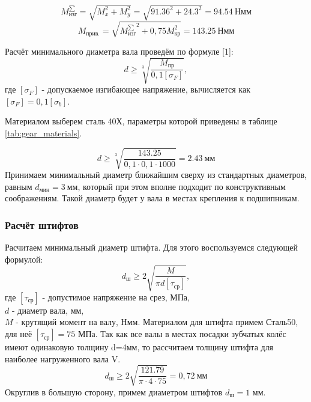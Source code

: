 \documentclass[14pt,a4paper,russian]{scrartcl}
\begin{document}
        \[ M^{\sum}_\text{изг} = \sqrt{M_x^2 + M_y^2} = \sqrt{91.36^2 + 24.3^2} = 94.54\ \text{Нмм}\]
        \[ M_\text{прив.} = \sqrt{{M^{\sum}_\text{изг}}^2 + 0,75M_\text{кр}^2} = 143.25\ \text{Нмм}\]

        Расчёт минимального диаметра вала проведём по формуле [1]:
        \[ d\geq \sqrt[3]{\frac{M_\text{пр}}{0,1[\sigma_F]}}, \]
        где \( [\sigma_F] \) - допускаемое изгибающее напряжение, вычисляется как
         \( [\sigma_F] = 0,1[\sigma_b] \).\par
        Материалом выберем сталь 40Х, параметры которой приведены в таблице \ref{tab:gear_materials}.\par

        \[ d\geq \sqrt[3]{\frac{143.25}{0,1\cdot 0,1\cdot 1000}} = 2.43\ \text{мм} \]
        Принимаем минимальный диаметр ближайшим сверху из стандартных диаметров, равным
        \( d_{\text{мин}} = 3\ \text{мм} \), который при этом вполне подходит по конструктивным
        соображениям. Такой диаметр будет у вала в местах крепления к подшипникам.

    \subsubsection{Расчёт штифтов}
        Расчитаем минимальный диаметр штифта. Для этого воспользуемся следующей формулой:
        \[ d_\text{ш} \geq 2\sqrt{\frac{M}{\pi d [\tau_{\text{ср}}]}}, \]
        где \( [\tau_{\text{ср}}] \) - допустимое напряжение на срез, МПа,\\
        \( d \) - диаметр вала, мм,\\
        \( M \) - крутящий момент на валу, Нмм.
        Материалом для штифта примем Сталь50, для неё \( [\tau_{\text{ср}}] =75\) МПа.
        Так как все валы в местах посадки зубчатых колёс имеют одинаковую толщину d=4мм, то рассчитаем
        толщину штифта для наиболее нагруженного вала V.
        \[ d_\text{ш} \geq 2\sqrt{\frac{121.79}{\pi\cdot 4\cdot 75}} = 0,72\ \text{мм} \]
        Округлив в большую сторону, примем диаметром штифтов \( d_\text{ш} = 1 \) мм.
        
\end{document}
